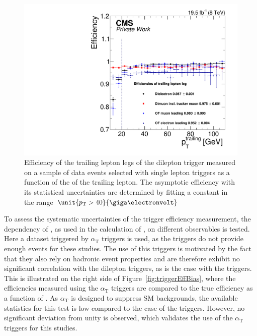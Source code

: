 \begin{figure}
\begin{center}
\includegraphics[scale=0.45]{plots/BG/trigger/Triggereff_SingleLepton_HighHTExclusive_Full2012_TrailingPt_leadingPt30Single.pdf}
\caption{Efficiency of the trailing lepton legs of the dilepton trigger measured on a sample of data events selected with single lepton triggers as a function of the \pt of the trailing lepton. The asymptotic efficiency with its statistical uncertainties are determined by fitting a constant in the range $\unit{\pt > 40}{\giga\electronvolt}$}
\label{fig:triggerEffTrailing}
\end{center}
\end{figure} 

To assess the systematic uncertainties of the trigger efficiency measurement, the dependency of \RT, as used in the calculation of \Rsfof, on different observables is tested. Here a dataset triggered by $\alpha_\mathrm{T}$ triggers is used, as the \HT triggers do not provide enough events for these studies. The use of this triggers is motivated by the fact that they also rely on hadronic event properties and are therefore exhibit no significant correlation with the dilepton triggers, as is the case with the \HT triggers. This is illustrated on the right side of Figure~\ref{fig:triggerEffBias}, where the efficiencies measured using the $\alpha_{\mathrm{T}}$ triggers are compared to the true efficiency as a function of \mll. As $\alpha_{\mathrm{T}}$ is designed to suppress SM backgrounds, the available statistics for this test is low compared to the case of the \HT triggers. However, no significant deviation from unity is observed, which validates the use of the $\alpha_{\mathrm{T}}$ triggers for this studies.

